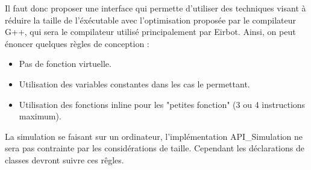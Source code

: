 Il faut donc proposer une interface qui permette d'utiliser des techniques visant à réduire la taille de l'éxécutable avec l'optimisation proposée par le compilateur G++, qui sera le compilateur utilisé principalement par Eirbot. Ainsi, on peut énoncer quelques règles de conception :
\begin{itemize}
    \item{Pas de fonction virtuelle.}
    \item{Utilisation des variables constantes dans les cas le permettant.}
    \item{Utilisation des fonctions inline pour les "petites fonction" (3 ou 4 instructions maximum).}
\end{itemize}

La simulation se faisant sur un ordinateur, l'implémentation API_Simulation ne sera pas contrainte par les considérations de taille. Cependant les déclarations de classes devront suivre ces rêgles.


